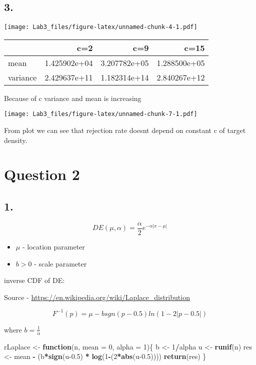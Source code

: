 \documentclass[
]{article}
\newenvironment{Shaded}{\begin{snugshade}}{\end{snugshade}}
\newcommand{\ControlFlowTok}[1]{\textcolor[rgb]{0.13,0.29,0.53}{\textbf{#1}}}
\newcommand{\DataTypeTok}[1]{\textcolor[rgb]{0.13,0.29,0.53}{#1}}
\newcommand{\DecValTok}[1]{\textcolor[rgb]{0.00,0.00,0.81}{#1}}
\newcommand{\FloatTok}[1]{\textcolor[rgb]{0.00,0.00,0.81}{#1}}
\newcommand{\KeywordTok}[1]{\textcolor[rgb]{0.13,0.29,0.53}{\textbf{#1}}}
\newcommand{\NormalTok}[1]{#1}
\newcommand{\OperatorTok}[1]{\textcolor[rgb]{0.81,0.36,0.00}{\textbf{#1}}}
\newcommand{\StringTok}[1]{\textcolor[rgb]{0.31,0.60,0.02}{#1}}
\providecommand{\tightlist}{%
  \setlength{\itemsep}{0pt}\setlength{\parskip}{0pt}}
\begin{document}
\hypertarget{section-2}{%
\subsection{3.}\label{section-2}}

\texttt{[image: Lab3\_files/figure-latex/unnamed-chunk-4-1.pdf]}

\begin{longtable}[]{@{}lrrr@{}}
\toprule
& c=2 & c=9 & c=15\tabularnewline
\midrule
\endhead
mean & 1.425902e+04 & 3.207782e+05 & 1.288500e+05\tabularnewline
variance & 2.429637e+11 & 1.182314e+14 & 2.840267e+12\tabularnewline
\bottomrule
\end{longtable}

Because of c variance and mean is increasing

\texttt{[image: Lab3\_files/figure-latex/unnamed-chunk-7-1.pdf]}

From plot we can see that rejection rate doesnt depend on constant c of
target density.

\hypertarget{question-2}{%
\section{Question 2}\label{question-2}}

\hypertarget{section-3}{%
\subsection{1.}\label{section-3}}

\[ DE(\mu, \alpha) = \frac{\alpha}{2} e^{-\alpha |x-\mu|}\]

\begin{itemize}
\tightlist
\item
  \(\mu\) - location parameter
\item
  \(b > 0\) - scale parameter
\end{itemize}

inverse CDF of DE:

Source - \url{https://en.wikipedia.org/wiki/Laplace_distribution}

\[F^{-1}(p) = \mu - b sgn(p-0.5)ln(1-2|p-0.5|)\]

where \(b = \frac 1 \alpha\)

\begin{Shaded}
\begin{Highlighting}[]
\NormalTok{rLaplace <-}\StringTok{ }\ControlFlowTok{function}\NormalTok{(n, }\DataTypeTok{mean =} \DecValTok{0}\NormalTok{, }\DataTypeTok{alpha =} \DecValTok{1}\NormalTok{)\{}
\NormalTok{  b <-}\StringTok{ }\DecValTok{1}\OperatorTok{/}\NormalTok{alpha}
\NormalTok{  u <-}\StringTok{ }\KeywordTok{runif}\NormalTok{(n)}
\NormalTok{  res <-}\StringTok{ }\NormalTok{mean }\OperatorTok{-}\StringTok{ }\NormalTok{(b}\OperatorTok{*}\KeywordTok{sign}\NormalTok{(u}\FloatTok{-0.5}\NormalTok{) }\OperatorTok{*}\StringTok{ }\KeywordTok{log}\NormalTok{(}\DecValTok{1}\OperatorTok{-}\NormalTok{(}\DecValTok{2}\OperatorTok{*}\KeywordTok{abs}\NormalTok{(u}\FloatTok{-0.5}\NormalTok{))))}
  \KeywordTok{return}\NormalTok{(res)}
\NormalTok{\}}
\end{Highlighting}
\end{Shaded}
\end{document}
